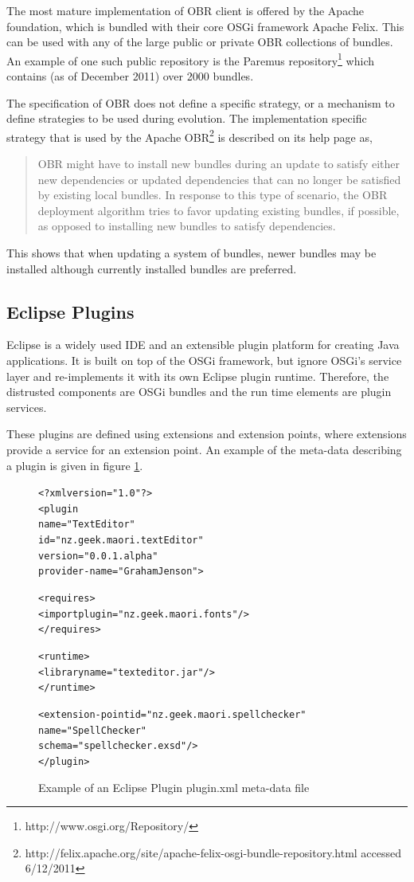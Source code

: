 The most mature implementation of OBR client is offered by the Apache foundation, which is bundled with their core OSGi framework Apache Felix. 
This can be used with any of the large public or private OBR collections of bundles.
An example of one such public repository is the Paremus repository\footnote{http://www.osgi.org/Repository/} which contains (as of December 2011) over 2000 bundles.

The specification of OBR does not define a specific strategy, or a mechanism to define strategies to be used during evolution.
The implementation specific strategy that is used by the Apache OBR\footnote{http://felix.apache.org/site/apache-felix-osgi-bundle-repository.html accessed 6/12/2011} 
is described on its help page as,

\begin{quotation}
OBR might have to install new bundles during an update to satisfy either new dependencies or updated dependencies that can no longer be satisfied by existing local bundles. 
In response to this type of scenario, the OBR deployment algorithm tries to favor updating existing bundles, if possible, as opposed to installing new bundles to satisfy dependencies.
\end{quotation}

This shows that when updating a system of bundles, newer bundles may be installed although currently installed bundles are preferred.

\subsection{Eclipse Plugins}
Eclipse is a widely used IDE and an extensible plugin platform for creating Java applications.
It is built on top of the OSGi framework, but ignore OSGi's service layer and re-implements it with its own Eclipse plugin runtime.
Therefore, the distrusted components are OSGi bundles and the run time elements are plugin services.

These plugins are defined using extensions and extension points, where extensions provide a service for an extension point.
An example of the meta-data describing a plugin is given in figure \ref{eclipseplugin}. 

\begin{figure}[htp]
\begin{center}
\begin{alltt}
<?xml version="1.0"?>
<plugin
    name="Text Editor"
    id="nz.geek.maori.textEditor"
    version="0.0.1.alpha"
    provider-name="Graham Jenson">
    
    <requires>
        <import plugin="nz.geek.maori.fonts"/>
    </requires>

    <runtime>
        <library name="texteditor.jar"/>
    </runtime>
    
    <extension-point id="nz.geek.maori.spellchecker" 
        name="Spell Checker" 
        schema="spellchecker.exsd"/>
</plugin>
\end{alltt}
  \caption[Eclipse Plugin meta-data]{Example of an Eclipse Plugin plugin.xml meta-data file}
  \label{eclipseplugin}
\end{center}
\end{figure}

